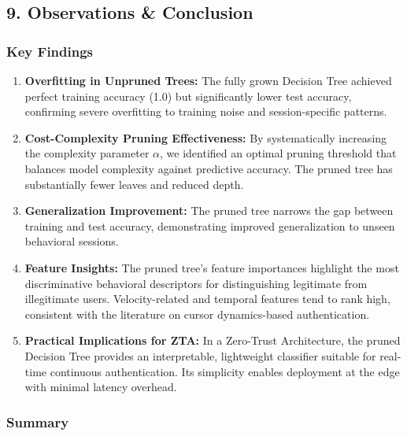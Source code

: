 \documentclass[11pt]{article}
\begin{document}
    \subsection{9. Observations \&
Conclusion}\label{observations-conclusion}

\subsubsection{Key Findings}\label{key-findings}

\begin{enumerate}
\def\labelenumi{\arabic{enumi}.}
\item
  \textbf{Overfitting in Unpruned Trees:} The fully grown Decision Tree
  achieved perfect training accuracy (1.0) but significantly lower test
  accuracy, confirming severe overfitting to training noise and
  session-specific patterns.
\item
  \textbf{Cost-Complexity Pruning Effectiveness:} By systematically
  increasing the complexity parameter \(\alpha\), we identified an
  optimal pruning threshold that balances model complexity against
  predictive accuracy. The pruned tree has substantially fewer leaves
  and reduced depth.
\item
  \textbf{Generalization Improvement:} The pruned tree narrows the gap
  between training and test accuracy, demonstrating improved
  generalization to unseen behavioral sessions.
\item
  \textbf{Feature Insights:} The pruned tree's feature importances
  highlight the most discriminative behavioral descriptors for
  distinguishing legitimate from illegitimate users. Velocity-related
  and temporal features tend to rank high, consistent with the
  literature on cursor dynamics-based authentication.
\item
  \textbf{Practical Implications for ZTA:} In a Zero-Trust Architecture,
  the pruned Decision Tree provides an interpretable, lightweight
  classifier suitable for real-time continuous authentication. Its
  simplicity enables deployment at the edge with minimal latency
  overhead.
\end{enumerate}

\subsubsection{Summary}\label{summary}
\end{document}

